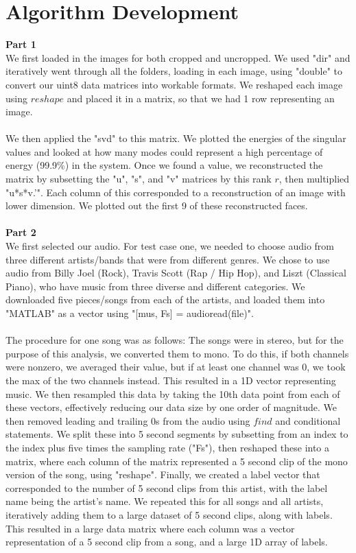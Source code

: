 \documentclass{article}
\begin{document}
\section*{\fontsize{19}{15}\selectfont Algorithm Development}
	\textbf{Part 1} \\
	We first loaded in the images for both cropped and uncropped. We used "dir" and iteratively went through all the folders, loading in each image, using "double" to convert our uint8 data matrices into workable formats. We reshaped each image using $reshape$ and placed it in a matrix, so that we had 1 row representing an image. \\ \\
We then applied the "svd" to this matrix. We plotted the energies of the singular values and looked at how many modes could represent a high percentage of energy (99.9\%) in the system. Once we found a value, we reconstructed the matrix by subsetting the "u", "s", and "v" matrices by this rank $r$, then multiplied "u*s*v.'". Each column of this corresponded to a reconstruction of an image with lower dimension. We plotted out the first 9 of these reconstructed faces. \\ \\
\textbf{Part 2} \\ 
	We first selected our audio. For test case one, we needed to choose audio from three different artists/bands that were from different genres. We chose to use audio from Billy Joel (Rock), Travis Scott (Rap / Hip Hop), and Liszt (Classical Piano), who have music from three diverse and different categories. We downloaded five pieces/songs from each of the artists, and loaded them into "MATLAB" as a vector using "[mus, Fs] = audioread(file)". \\ \\
The procedure for one song was as follows: The songs were in stereo, but for the purpose of this analysis, we converted them to mono. To do this, if both channels were nonzero, we averaged their value, but if at least one channel was 0, we took the max of the two channels instead. This resulted in a 1D vector representing music. We then resampled this data by taking the 10th data point from each of these vectors, effectively reducing our data size by one order of magnitude. We then removed leading and trailing 0s from the audio using $find$ and conditional statements. We split these into 5 second segments by subsetting from an index to the index plus five times the sampling rate ("Fs"), then reshaped these into a matrix, where each column of the matrix represented a 5 second clip of the mono version of the song, using "reshape". Finally, we created a label vector that corresponded to the number of 5 second clips from this artist, with the label name being the artist's name. We repeated this for all songs and all artists, iteratively adding them to a large dataset of 5 second clips, along with labels. This resulted in a large data matrix where each column was a vector representation of a 5 second clip from a song, and a large 1D array of labels. \\ \\
\end{document}
